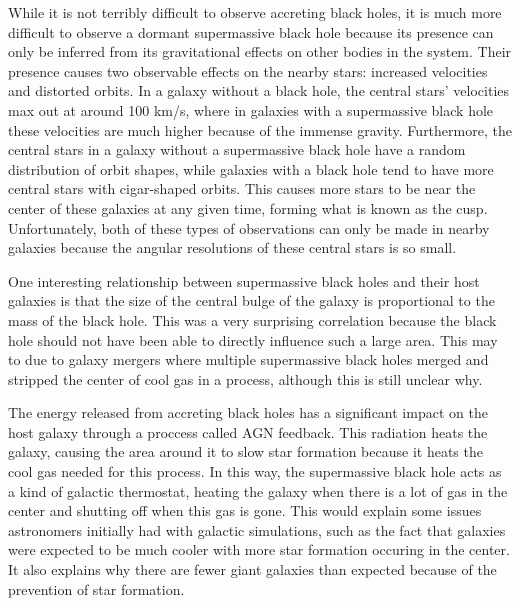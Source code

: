 \documentclass[12pt]{article}
\begin{document}
While it is not terribly difficult to observe accreting black holes, it is much
more difficult to observe a dormant supermassive black hole because its presence
can only be inferred from its gravitational effects on other bodies in the
system.  Their presence causes two observable effects on the nearby stars:
increased velocities and distorted orbits.  In a galaxy without a black hole,
the central stars' velocities max out at around 100 km/s, where in galaxies with
a supermassive black hole these velocities are much higher because of the
immense gravity.  Furthermore, the central stars in a galaxy without a
supermassive black hole have a random distribution of orbit shapes, while
galaxies with a black hole tend to have more central stars with cigar-shaped
orbits.  This causes more stars to be near the center of these galaxies at any
given time, forming what is known as the cusp.  Unfortunately, both of these
types of observations can only be made in nearby galaxies because the angular
resolutions of these central stars is so small.

One interesting relationship between supermassive black holes and their host
galaxies is that the size of the central bulge of the galaxy is proportional to
the mass of the black hole.  This was a very surprising correlation because the
black hole should not have been able to directly influence such a large area.
This may to due to galaxy mergers where multiple supermassive black holes merged
and stripped the center of cool gas in a process, although this is still unclear
why.

The energy released from accreting black holes has a significant impact on the
host galaxy through a proccess called AGN feedback.  This radiation heats the
galaxy, causing the area around it to slow star formation because it heats the
cool gas needed for this process.  In this way, the supermassive black hole acts
as a kind of galactic thermostat, heating the galaxy when there is a lot of gas
in the center and shutting off when this gas is gone.  This would explain some
issues astronomers initially had with galactic simulations, such as the fact
that galaxies were expected to be much cooler with more star formation occuring
in the center.  It also explains why there are fewer giant galaxies than
expected because of the prevention of star formation.
\end{document}

